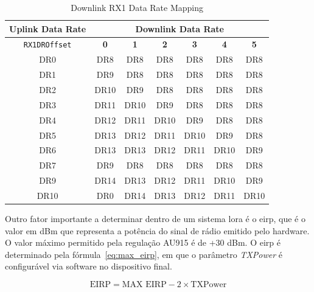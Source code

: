 \begin{table}[H]
  \centering
  \caption{Downlink RX1 Data Rate Mapping}
  \label{tab:rx1_datarate_mapping}
  \renewcommand{\arraystretch}{1.2}
  \begin{tabular}{|c|c|c|c|c|c|c|}
    \hline
    \textbf{Uplink Data Rate} & \multicolumn{6}{c|}{\textbf{Downlink Data Rate}} \\ \hline
    \texttt{RX1DROffset} & \textbf{0} & \textbf{1} & \textbf{2} & \textbf{3} & \textbf{4} & \textbf{5} \\ \hline
    DR0  & DR8  & DR8  & DR8  & DR8  & DR8  & DR8  \\ \hline
    DR1  & DR9  & DR8  & DR8  & DR8  & DR8  & DR8  \\ \hline
    DR2  & DR10 & DR9  & DR8  & DR8  & DR8  & DR8  \\ \hline
    DR3  & DR11 & DR10 & DR9  & DR8  & DR8  & DR8  \\ \hline
    DR4  & DR12 & DR11 & DR10 & DR9  & DR8  & DR8  \\ \hline
    DR5  & DR13 & DR12 & DR11 & DR10 & DR9  & DR8  \\ \hline
    DR6  & DR13 & DR13 & DR12 & DR11 & DR10 & DR9  \\ \hline
    DR7  & DR9  & DR8  & DR8  & DR8  & DR8  & DR8  \\ \hline
    DR9  & DR14 & DR13 & DR12 & DR11 & DR10 & DR9  \\ \hline
    DR10 & DR0  & DR14 & DR13 & DR12 & DR11 & DR10 \\ \hline
  \end{tabular}
\end{table}


Outro fator importante a determinar dentro de um sistema \gls{lora} é o \gls{eirp}, 
que é o valor em dBm que representa a potência do sinal de rádio emitido pelo hardware. 
O valor máximo permitido pela regulação AU915 é de +30 dBm. 
O \gls{eirp} é determinado pela fórmula~\ref{eq:max_eirp}, 
em que o parâmetro \textit{TXPower} é configurável via software no dispositivo final.

\begin{equation}
\label{eq:max_eirp}
\text{EIRP} = \text{MAX EIRP} - 2 \times \text{TXPower}
\end{equation}

